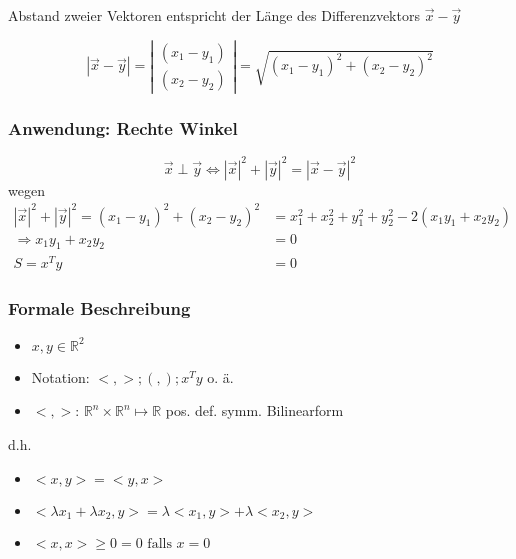 \begin{note}
Abstand zweier Vektoren entspricht der Länge des Differenzvektors $\vec{x} - \vec{y}$
\end{note}

\begin{equation*}
	|\vec{x} - \vec{y}| = \left|
 	\begin{array}{cc}
		(x_1 - y_1)\\
		(x_2 - y_2)
 	\end{array}\right| = 
 	\sqrt{(x_1 - y_1)^2 + (x_2 - y_2)^2}
\end{equation*}

\subsubsection*{Anwendung: Rechte Winkel}

\begin{theorem}
\begin{equation*}
	\vec{x} \perp \vec{y} \Leftrightarrow |\vec{x}|^2 + |\vec{y}|^2 = |\vec{x} - \vec{y}|^2
\end{equation*}
wegen
\begin{align*}
	|\vec{x}|^2 + |\vec{y}|^2 = (x_1 - y_1)^2 + (x_2 - y_2)^2 &= x_1^2 + x_2^2 + y_1^2 + y_2^2 - 2(x_1 y_1 + x_2 y_2) \\
	\Rightarrow x_1 y_1 + x_2 y_2 &= 0 \\
	S = x^T y &= 0
\end{align*}
\end{theorem}


\subsubsection*{Formale Beschreibung}
\begin{definition}[Skalarprodukt]\flush
	\begin{itemize}
		\item $ x, y \in \mathbb{R}^2 $
		\item Notation: $ <, >; (, ); x^T y$ o. ä.
		\item $<, >$: $\mathbb{R}^n \times \mathbb{R}^n \mapsto \mathbb{R}$ pos. def. symm. Bilinearform
	\end{itemize}
\end{definition}

d.h. \begin{itemize}
	\item $ <x, y> = <y, x>$
	\item $ <\lambda x_1 + \lambda x_2, y> = \lambda <x_1, y> + \lambda <x_2, y>$
	\item $ <x, x> \geq 0 = 0 \text{ falls } x = 0$
\end{itemize}

